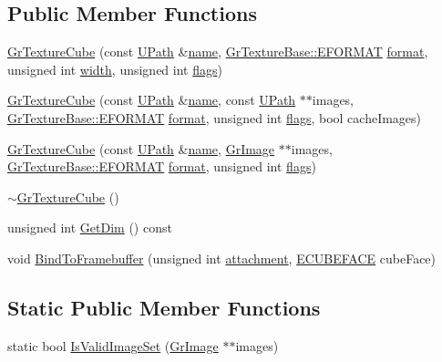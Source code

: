 \begin{CompactItemize}
\subsection*{Public Member Functions}
\begin{CompactItemize}
\item 
\hyperlink{class_gr_texture_cube_8668abef3149469fe1680350e56d194a}{GrTextureCube} (const \hyperlink{class_u_path}{UPath} \&\hyperlink{glext__bak_8h_bb62efe59ccdd153ce42e1a418352209}{name}, \hyperlink{class_gr_texture_base_82c606022e93566ba55fe4cd3beb687c}{GrTextureBase::EFORMAT} \hyperlink{glext__bak_8h_e2d3db041c6004a67047659b42f73a44}{format}, unsigned int \hyperlink{wglext_8h_e6531b1788ca42a9ae8155b0c52e7630}{width}, unsigned int \hyperlink{_u_t_message_8h_0a3c0b351ab09281b662a9ff4f900a53}{flags})
\item 
\hyperlink{class_gr_texture_cube_d703eec85745ee86d33cc30c54e99496}{GrTextureCube} (const \hyperlink{class_u_path}{UPath} \&\hyperlink{glext__bak_8h_bb62efe59ccdd153ce42e1a418352209}{name}, const \hyperlink{class_u_path}{UPath} $\ast$$\ast$images, \hyperlink{class_gr_texture_base_82c606022e93566ba55fe4cd3beb687c}{GrTextureBase::EFORMAT} \hyperlink{glext__bak_8h_e2d3db041c6004a67047659b42f73a44}{format}, unsigned int \hyperlink{_u_t_message_8h_0a3c0b351ab09281b662a9ff4f900a53}{flags}, bool cacheImages)
\item 
\hyperlink{class_gr_texture_cube_6721b847573cbeb2ad4ec7fc9d358329}{GrTextureCube} (const \hyperlink{class_u_path}{UPath} \&\hyperlink{glext__bak_8h_bb62efe59ccdd153ce42e1a418352209}{name}, \hyperlink{class_gr_image}{GrImage} $\ast$$\ast$images, \hyperlink{class_gr_texture_base_82c606022e93566ba55fe4cd3beb687c}{GrTextureBase::EFORMAT} \hyperlink{glext__bak_8h_e2d3db041c6004a67047659b42f73a44}{format}, unsigned int \hyperlink{_u_t_message_8h_0a3c0b351ab09281b662a9ff4f900a53}{flags})
\item 
\hyperlink{class_gr_texture_cube_db0024c06cac0f1e5cd6cbd6ba893e77}{$\sim$GrTextureCube} ()
\item 
unsigned int \hyperlink{class_gr_texture_cube_8b80ffcf02983fb848a70e12d31c07fa}{GetDim} () const 
\item 
void \hyperlink{class_gr_texture_cube_83627920cbb16d0bd7a2f9821c0125d1}{BindToFramebuffer} (unsigned int \hyperlink{glext__bak_8h_d8f97111cc6514af5f352219d1cceb40}{attachment}, \hyperlink{class_gr_texture_cube_49c6f83c73520edfce04f4eb5dcfe6a0}{ECUBEFACE} cubeFace)
\end{CompactItemize}
\subsection*{Static Public Member Functions}
\begin{CompactItemize}
\item 
static bool \hyperlink{class_gr_texture_cube_4b60a3b45e856404c29a5a702656f9d0}{IsValidImageSet} (\hyperlink{class_gr_image}{GrImage} $\ast$$\ast$images)
\end{CompactItemize}



\end{CompactItemize}
